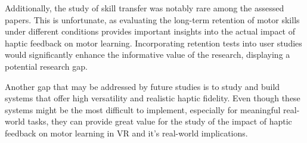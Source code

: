 Additionally, the study of skill transfer was notably rare among the assessed papers. This is unfortunate, as evaluating the long-term retention of motor skills under different conditions provides important insights into the actual impact of haptic feedback on motor learning. Incorporating retention tests into user studies would significantly enhance the informative value of the research, displaying a potential research gap.

Another gap that may be addressed by future studies is to study and build systems that offer high versatility and realistic haptic fidelity. Even though these systems might be the most difficult to implement, especially for meaningful real-world tasks, they can provide great value for the study of the impact of haptic feedback on motor learning in VR and it's real-world implications. 

